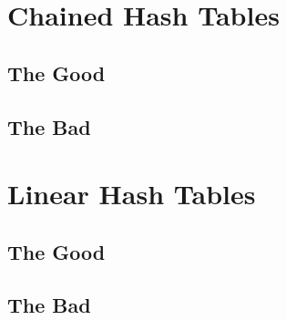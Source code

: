 \documentclass{muformallab}
\begin{document}
  \section{Chained Hash Tables}

  \subsection{The Good}

  \subsection{The Bad}


  \section{Linear Hash Tables}

  \subsection{The Good}

  \subsection{The Bad}
\end{document}
